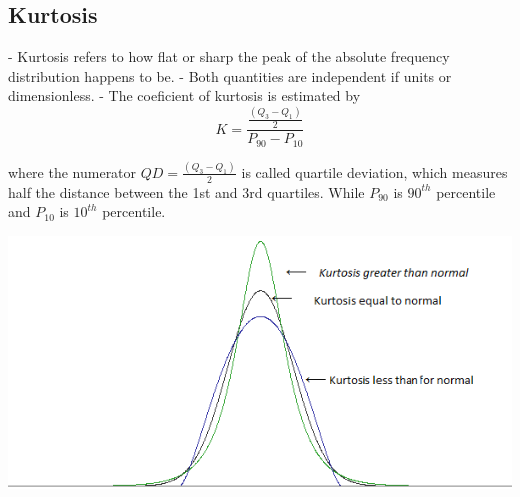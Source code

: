 \documentclass[12pt,a4paper]{article}
\begin{document}
\subsection{Kurtosis}
- Kurtosis refers to how flat or sharp the peak of the absolute frequency distribution happens to be.
- Both quantities are independent if units or dimensionless.
- The coeficient of kurtosis is estimated by
\begin{equation}
    K = \frac{\frac{(Q_3 - Q_1)}{2} }{P_90 - P_10}
\end{equation}

where the numerator $QD = \frac{(Q_3 - Q_1)}{2}$ is called quartile deviation, which measures half the distance between the 1st and 3rd quartiles. While $P_90$ is $90^{th}$ percentile and $P_10$ is $10^{th}$ percentile.

\hbox{\includegraphics[width=\textwidth]{kurtosis.png}}
\end{document}
